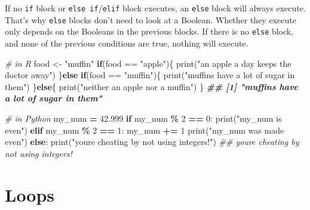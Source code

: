 \documentclass[
  12pt,
  krantz2]{krantz}
\makeatletter
\newenvironment{Shaded}{\begin{snugshade}}{\end{snugshade}}
\newcommand{\BuiltInTok}[1]{#1}
\newcommand{\CommentTok}[1]{\textcolor[rgb]{0.37,0.37,0.37}{\textit{#1}}}
\newcommand{\ControlFlowTok}[1]{\textcolor[rgb]{0.27,0.27,0.27}{\textbf{#1}}}
\newcommand{\DecValTok}[1]{\textcolor[rgb]{0.06,0.06,0.06}{#1}}
\newcommand{\DocumentationTok}[1]{\textcolor[rgb]{0.37,0.37,0.37}{\textbf{\textit{#1}}}}
\newcommand{\FloatTok}[1]{\textcolor[rgb]{0.06,0.06,0.06}{#1}}
\newcommand{\FunctionTok}[1]{\textcolor[rgb]{0,0,0}{#1}}
\newcommand{\NormalTok}[1]{#1}
\newcommand{\OperatorTok}[1]{\textcolor[rgb]{0.43,0.43,0.43}{\textbf{#1}}}
\newcommand{\OtherTok}[1]{\textcolor[rgb]{0.37,0.37,0.37}{#1}}
\newcommand{\SpecialCharTok}[1]{\textcolor[rgb]{0,0,0}{#1}}
\newcommand{\StringTok}[1]{\textcolor[rgb]{0.5,0.5,0.5}{#1}}
\newenvironment{kframe}{%
\medskip{}
\setlength{\fboxsep}{.8em}
 \def\at@end@of@kframe{}%
 \ifinner\ifhmode%
  \def\at@end@of@kframe{\end{minipage}}%
  \begin{minipage}{\columnwidth}%
 \fi\fi%
 \def\FrameCommand##1{\hskip\@totalleftmargin \hskip-\fboxsep
 \colorbox{shadecolor}{##1}\hskip-\fboxsep
     \hskip-\linewidth \hskip-\@totalleftmargin \hskip\columnwidth}%
 \MakeFramed {\advance\hsize-\width
   \@totalleftmargin\z@ \linewidth\hsize
   \@setminipage}}%
 {\par\unskip\endMakeFramed%
 \at@end@of@kframe}
\renewenvironment{Shaded}{\begin{kframe}}{\end{kframe}}
\makeatother
\begin{document}
If no \texttt{if} block or \texttt{else\ if}/\texttt{elif} block executes, an \texttt{else} block will always execute. That's why \texttt{else} blocks don't need to look at a Boolean. Whether they execute only depends on the Booleans in the previous blocks. If there is no \texttt{else} block, and none of the previous conditions are true, nothing will execute.

\begin{Shaded}
\begin{Highlighting}[]
\CommentTok{\# in R}
\NormalTok{food }\OtherTok{\textless{}{-}} \StringTok{"muffin"}
\ControlFlowTok{if}\NormalTok{(food }\SpecialCharTok{==} \StringTok{"apple"}\NormalTok{)\{}
    \FunctionTok{print}\NormalTok{(}\StringTok{"an apple a day keeps the doctor away"}\NormalTok{)}
\NormalTok{\}}\ControlFlowTok{else} \ControlFlowTok{if}\NormalTok{(food }\SpecialCharTok{==} \StringTok{"muffin"}\NormalTok{)\{}
  \FunctionTok{print}\NormalTok{(}\StringTok{"muffins have a lot of sugar in them"}\NormalTok{)}
\NormalTok{\}}\ControlFlowTok{else}\NormalTok{\{}
  \FunctionTok{print}\NormalTok{(}\StringTok{"neither an apple nor a muffin"}\NormalTok{)}
\NormalTok{\}}
\DocumentationTok{\#\# [1] "muffins have a lot of sugar in them"}
\end{Highlighting}
\end{Shaded}

\begin{Shaded}
\begin{Highlighting}[]
\CommentTok{\# in Python}
\NormalTok{my\_num }\OperatorTok{=} \FloatTok{42.999}
\ControlFlowTok{if}\NormalTok{ my\_num }\OperatorTok{\%} \DecValTok{2} \OperatorTok{==} \DecValTok{0}\NormalTok{:}
    \BuiltInTok{print}\NormalTok{(}\StringTok{"my\_num is even"}\NormalTok{)}
\ControlFlowTok{elif}\NormalTok{ my\_num }\OperatorTok{\%} \DecValTok{2} \OperatorTok{==} \DecValTok{1}\NormalTok{:}
\NormalTok{    my\_num }\OperatorTok{+=} \DecValTok{1}
    \BuiltInTok{print}\NormalTok{(}\StringTok{"my\_num was made even"}\NormalTok{)}
\ControlFlowTok{else}\NormalTok{:}
    \BuiltInTok{print}\NormalTok{(}\StringTok{"you\textquotesingle{}re cheating by not using integers!"}\NormalTok{)}
\CommentTok{\#\# you\textquotesingle{}re cheating by not using integers!}
\end{Highlighting}
\end{Shaded}

\hypertarget{loops}{%
\section{Loops}\label{loops}}
\end{document}
